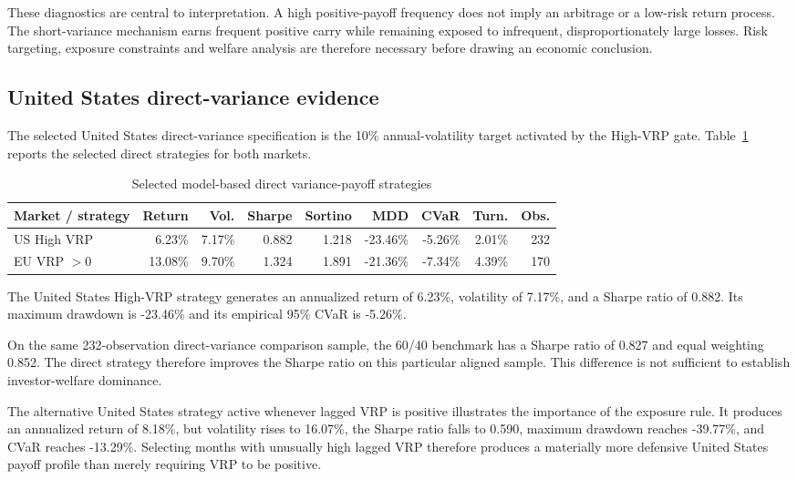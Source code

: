 These diagnostics are central to interpretation. A high positive-payoff frequency does not imply an arbitrage or a low-risk return process. The short-variance mechanism earns frequent positive carry while remaining exposed to infrequent, disproportionately large losses. Risk targeting, exposure constraints and welfare analysis are therefore necessary before drawing an economic conclusion.

\subsection{United States direct-variance evidence}

The selected United States direct-variance specification is the 10\% annual-volatility target activated by the High-VRP gate. Table~\ref{tab:direct_main} reports the selected direct strategies for both markets.

\begin{table}[htbp]
\centering
\small
\caption{Selected model-based direct variance-payoff strategies}
\label{tab:direct_main}
\begin{tabularx}{\textwidth}{Xrrrrrrrr}
\toprule
Market / strategy
& Return
& Vol.
& Sharpe
& Sortino
& MDD
& CVaR
& Turn.
& Obs. \\
\midrule
US High VRP
& 6.23\%
& 7.17\%
& 0.882
& 1.218
& -23.46\%
& -5.26\%
& 2.01\%
& 232 \\
EU VRP $>0$
& 13.08\%
& 9.70\%
& 1.324
& 1.891
& -21.36\%
& -7.34\%
& 4.39\%
& 170 \\
\bottomrule
\end{tabularx}
\end{table}

The United States High-VRP strategy generates an annualized return of 6.23\%, volatility of 7.17\%, and a Sharpe ratio of 0.882. Its maximum drawdown is -23.46\% and its empirical 95\% CVaR is -5.26\%.

On the same 232-observation direct-variance comparison sample, the 60/40 benchmark has a Sharpe ratio of 0.827 and equal weighting 0.852. The direct strategy therefore improves the Sharpe ratio on this particular aligned sample. This difference is not sufficient to establish investor-welfare dominance.

The alternative United States strategy active whenever lagged VRP is positive illustrates the importance of the exposure rule. It produces an annualized return of 8.18\%, but volatility rises to 16.07\%, the Sharpe ratio falls to 0.590, maximum drawdown reaches -39.77\%, and CVaR reaches -13.29\%. Selecting months with unusually high lagged VRP therefore produces a materially more defensive United States payoff profile than merely requiring VRP to be positive.

